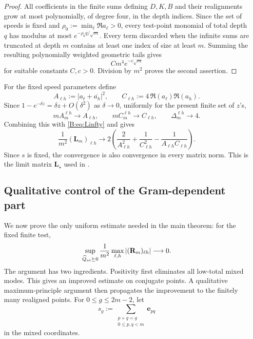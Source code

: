 \begin{proof}
All coefficients in the finite sums defining $D,K,B$ and their
realignments grow at most polynomially, of degree four, in the depth
indices.  Since the set of speeds is fixed and
$\rho_0:=\min_\ell\Re a_\ell>0$, every test-point monomial of total
depth $q$ has modulus at most $e^{-\rho_0 q/\sqrt m}$.  Every term
discarded when the infinite sums are truncated at depth $m$ contains
at least one index of size at least $m$.  Summing the resulting
polynomially weighted geometric tails gives
\[
 C m^4e^{-c\sqrt m}
\]
for suitable constants $C,c>0$.  Division by $m^2$ proves the second
assertion.
\end{proof}

For the fixed speed parameters define
\begin{equation}\label{B:eq:AC-limit}
 A_{\ell h}:=
 |a_\ell+\overline{a_h}|^2,\qquad
 C_{\ell h}:=
 4\,\Re(a_\ell)\Re(a_h).
\end{equation}
Since $1-e^{-\delta z}=\delta z+O(\delta^2)$ as $\delta\to0$,
uniformly for the present finite set of $z$'s,
\[
 m A_m^{\ell h}\longrightarrow A_{\ell h},\qquad
 m C_m^{\ell h}\longrightarrow C_{\ell h},\qquad
 \Delta_m^{\ell h}\longrightarrow4.
\]
Combining this with \eqref{B:eq:Linfty} and
 gives
\[
 \frac{1}{m^2}(\mathbf L_m)_{\ell h}
 \longrightarrow
 2\left(
 \frac{2}{A_{\ell h}^2}
 +\frac{1}{C_{\ell h}^2}
 -\frac{1}{A_{\ell h}C_{\ell h}}
 \right).
\]
Since $s$ is fixed, the convergence is also convergence in every
matrix norm.  This is the limit matrix $\mathbf L_\star$ used in
.

\subsection{Qualitative control of the Gram-dependent part}

We now prove the only uniform estimate needed in the main theorem:
for the fixed finite test,
\[
 \sup_{\widehat Q_{\rm av}\succeq0}
 \frac{1}{m^2}
 \max_{\ell,h}|(\mathbf R_m)_{\ell h}|
 \longrightarrow0.
\]
The argument has two ingredients.  Positivity first eliminates all
low-total mixed modes.  This gives an improved estimate on conjugate
points.  A qualitative maximum-principle argument then propagates the
improvement to the finitely many realigned points. 
For $0\le g\le2m-2$, let
\[
 s_g:=\sum_{\substack{p+q=g\\0\le p,q<m}}\mathbf e_{pq}
\]
in the mixed coordinates.

